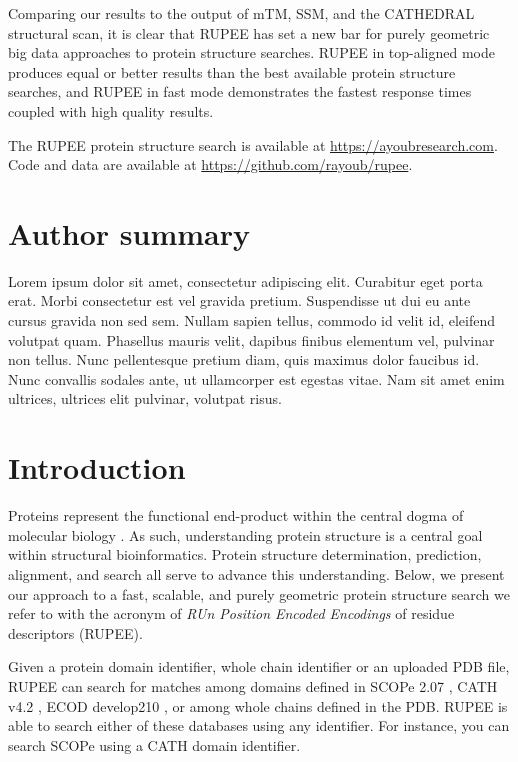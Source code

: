 \documentclass[10pt,letterpaper]{article}
\begin{document}
Comparing our results to the output of mTM, SSM, and the CATHEDRAL structural scan, it is clear that RUPEE has set a new bar for purely geometric big data approaches to protein structure searches.
RUPEE in top-aligned mode produces equal or better results than the best available protein structure searches, and RUPEE in fast mode demonstrates the fastest response times coupled with high quality results. 

The RUPEE protein structure search is available at \url{https://ayoubresearch.com}. 
Code and data are available at \url{https://github.com/rayoub/rupee}.

\section*{Author summary}
Lorem ipsum dolor sit amet, consectetur adipiscing elit. Curabitur eget porta erat. Morbi consectetur est vel gravida pretium. Suspendisse ut dui eu ante cursus gravida non sed sem. Nullam sapien tellus, commodo id velit id, eleifend volutpat quam. Phasellus mauris velit, dapibus finibus elementum vel, pulvinar non tellus. Nunc pellentesque pretium diam, quis maximus dolor faucibus id. Nunc convallis sodales ante, ut ullamcorper est egestas vitae. Nam sit amet enim ultrices, ultrices elit pulvinar, volutpat risus.

\linenumbers

\section*{Introduction}

Proteins represent the functional end-product within the central dogma of molecular biology \cite{Crick1970}.
As such, understanding protein structure is a central goal within structural bioinformatics. 
Protein structure determination, prediction, alignment, and search all serve to advance this understanding. 
Below, we present our approach to a fast, scalable, and purely geometric protein structure search we refer to with the acronym of \emph{RUn Position Encoded Encodings} of residue descriptors (RUPEE).

Given a protein domain identifier, whole chain identifier or an uploaded PDB file, RUPEE can search for matches among domains defined in SCOPe 2.07 \cite{Fox2013}, CATH v4.2 \cite{Orengo1997}, ECOD develop210 \cite{Cheng2014}, or among whole chains defined in the PDB.
RUPEE is able to search either of these databases using any identifier. 
For instance, you can search SCOPe using a CATH domain identifier. 
\end{document}
